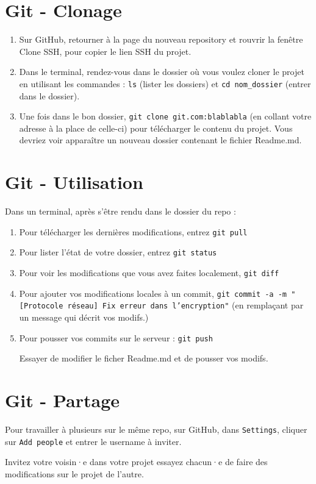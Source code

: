 \documentclass[11pt, a4paper]{book}
\begin{document}
\section{Git - Clonage}

\begin{enumerate}
    \item Sur GitHub, retourner à la page du nouveau repository et rouvrir la fenêtre Clone SSH, pour copier le lien SSH du projet. 
    \item Dans le terminal, rendez-vous dans le dossier où vous voulez cloner le projet en utilisant les commandes :
        \subitem \texttt{ls} (lister les dossiers) 
        \subitem et \texttt{cd nom\_dossier} (entrer dans le dossier).
    \item Une fois dans le bon dossier, \texttt{git clone git\@github.com:blablabla} (en collant votre adresse à la place de celle-ci) pour télécharger le contenu du projet. Vous devriez voir apparaître un nouveau dossier contenant le fichier Readme.md.

\end{enumerate}

\section{Git - Utilisation}
Dans un terminal, après s'être rendu dans le dossier du repo : 
\begin{enumerate}
    \item Pour télécharger les dernières modifications, entrez \texttt{git pull}
    \item Pour lister l'état de votre dossier, entrez \texttt{git status}
    \item Pour voir les modifications que vous avez faites localement,  \texttt{git diff}
    \item Pour ajouter vos modifications locales à un commit,  \texttt{git commit -a -m "[Protocole réseau] Fix erreur dans l'encryption"} (en remplaçant par un message qui décrit vos modifs.)
    \item Pour pousser vos commits sur le serveur :   \texttt{git push}

Essayer de modifier le ficher Readme.md et de pousser vos modifs.
\end{enumerate}

\section{Git - Partage}
Pour travailler à plusieurs sur le même repo,  sur GitHub, dans \texttt{Settings}, cliquer sur \texttt{Add people} et entrer le username à inviter.

Invitez votre voisin·e dans votre projet essayez chacun·e de faire des modifications sur le projet de l'autre.
\end{document}
